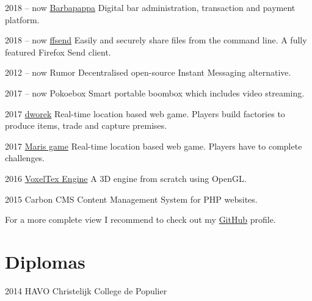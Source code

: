 \documentclass[]{friggeri-cv}
\begin{document}
\begin{entrylist}

\entry
{2018 -- now}
{\href{https://github.com/timvisee/barbapappa}{Barbapappa}}
{}
{Digital bar administration, transaction and payment platform.}

\entry
{2018 -- now}
{\href{https://github.com/timvisee/ffsend}{ffsend}}
{}
{Easily and securely share files from the command line. A fully featured Firefox Send client.}

\entry
{2012 -- now}
{Rumor}
{}
{Decentralised open-source Instant Messaging alternative.}

\entry
{2017 -- now}
{Pokoebox}
{}
{Smart portable boombox which includes video streaming.}

\entry
{2017}
{\href{https://github.com/timvisee/dworek}{dworek}}
{}
{Real-time location based web game. Players build factories to produce items,
trade and capture premises.}

\entry
{2017}
{\href{https://github.com/timvisee/maris-game}{Maris game}}
{}
{Real-time location based web game. Players have to complete challenges.}

\entry
{2016}
{\href{https://github.com/timvisee/voxeltex-engine}{VoxelTex Engine}}
{}
{A 3D engine from scratch using OpenGL.}

\entry
{2015}
{Carbon CMS}
{}
{Content Management System for PHP websites.}

\end{entrylist}

For a more complete view I recommend to check out my
\href{https://github.com/timvisee}{GitHub}
profile.


\section{Diplomas}

\begin{entrylist}


\entry
{2014}
{HAVO}
{Christelijk College de Populier}


\end{entrylist}
\end{document}
